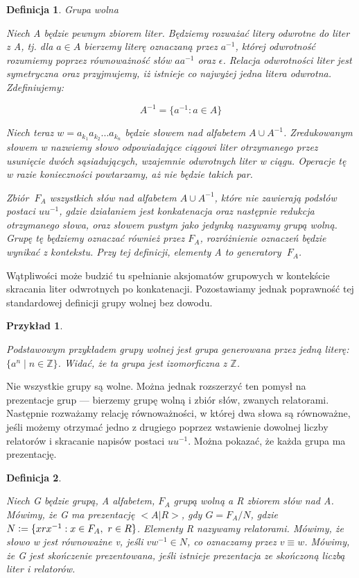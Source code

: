 \documentclass[licencjacka]{pracamgr}
\newcommand{\defeq}{\vcentcolon=}
\newtheorem{defi}{Definicja}[section]
\newtheorem{exampl}{Przykład}[section]
\begin{document}
\begin{defi}{Grupa wolna}\label{def:free_group}

Niech A będzie pewnym zbiorem liter. Będziemy rozważać litery odwrotne do liter z A, tj. dla $a \in A$ bierzemy literę oznaczaną przez $a^{-1}$, której odwrotność rozumiemy poprzez równoważność słów $aa^{-1}$ oraz $\epsilon$. Relacja odwrotności liter jest symetryczna oraz przyjmujemy, iż istnieje co najwyżej jedna litera odwrotna. Zdefiniujemy:

\[ A^{-1} = \{ a^{-1} : a \in A \} \]

Niech teraz $w = a_{k_1}a_{k_2}...a_{k_n}$ będzie słowem nad alfabetem $A \cup A^{-1}$. Zredukowanym słowem w nazwiemy słowo odpowiadające ciągowi liter otrzymanego przez usunięcie dwóch sąsiadujących, wzajemnie odwrotnych liter w ciągu. Operacje tę w razie konieczności powtarzamy, aż nie będzie takich par.

Zbiór $\ F_A$ wszystkich słów nad alfabetem $A \cup A^{-1}$, które nie zawierają podsłów postaci $uu^{-1}$, gdzie działaniem jest konkatenacja oraz następnie redukcja otrzymanego słowa, oraz słowem pustym jako jedynką nazywamy \textit{grupą wolną}. Grupę tę będziemy oznaczać również przez $F_A$, rozróżnienie oznaczeń będzie wynikać z kontekstu. Przy tej definicji, elementy A to \textit{generatory} $\ F_A$.

\end{defi}

Wątpliwości może budzić tu spełnianie aksjomatów grupowych w kontekście skracania liter odwrotnych po konkatenacji. Pozostawiamy jednak poprawność tej standardowej definicji grupy wolnej bez dowodu.

\begin{exampl}\label{exp:free_group}

Podstawowym przykładem grupy wolnej jest grupa generowana przez jedną literę: $\{ a^{n} \mid n \in \mathbb{Z} \}$. Widać, że ta grupa jest izomorficzna z $\mathbb{Z}$.

\end{exampl}

Nie wszystkie grupy są wolne. Można jednak rozszerzyć ten pomysł na prezentacje grup — bierzemy grupę wolną i zbiór słów, zwanych relatorami. Następnie rozważamy relację równoważności, w której dwa słowa są równoważne, jeśli możemy otrzymać jedno z drugiego poprzez wstawienie dowolnej liczby relatorów i skracanie napisów postaci $uu^{-1}$. Można pokazać, że każda grupa ma prezentację.

\begin{defi}\label{presentation of group}

Niech G będzie grupą, A alfabetem, $F_A$ grupą wolną a R zbiorem słów nad A. Mówimy, że G ma prezentację $<A | R>$, gdy $G = F_A / N$, gdzie $N \defeq \{ x r x^{-1} : x \in F_A, \ r \in R \}$. Elementy R nazywamy relatorami. Mówimy, że słowo w jest równoważne v, jeśli $vw^{-1} \in N$, co oznaczamy przez $v \equiv w$. Mówimy, że G jest skończenie prezentowana, jeśli istnieje prezentacja ze skończoną liczbą liter i relatorów.

\end{defi}
\end{document}
